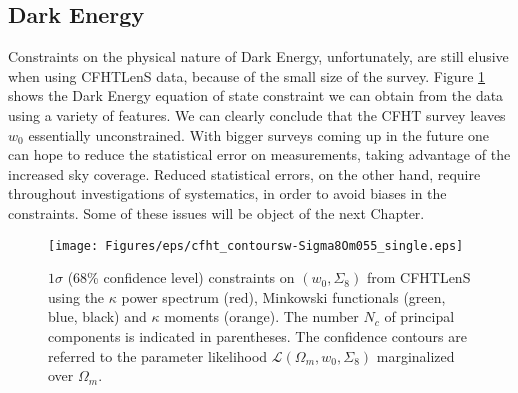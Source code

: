 \subsection{Dark Energy}
Constraints on the physical nature of Dark Energy, unfortunately, are still elusive when using CFHTLenS data, because of the small size of the survey. Figure \ref{fig:6:cwSi855signle} shows the Dark Energy equation of state constraint we can obtain from the data using a variety of features. We can clearly conclude that the CFHT survey leaves $w_0$ essentially unconstrained. With bigger surveys coming up in the future one can hope to reduce the statistical error on measurements, taking advantage of the increased sky coverage. Reduced statistical errors, on the other hand, require throughout investigations of systematics, in order to avoid biases in the constraints. Some of these issues will be object of the next Chapter. 
%
\begin{figure}[h!]
\begin{center}
\texttt{[image: Figures/eps/cfht\_contoursw-Sigma8Om055\_single.eps]}
\end{center}
\caption{$1\sigma$ (68\% confidence level) constraints on $(w_0,\Sigma_8)$ from CFHTLenS using the $\kappa$ power spectrum (red), Minkowski functionals (green, blue, black) and $\kappa$ moments (orange). The number $N_c$ of principal components is indicated in parentheses. The confidence contours are referred to the parameter likelihood $\mathcal{L}(\Omega_m,w_0,\Sigma_8)$ marginalized over $\Omega_m$.}
\label{fig:6:cwSi855signle}
\end{figure}


%